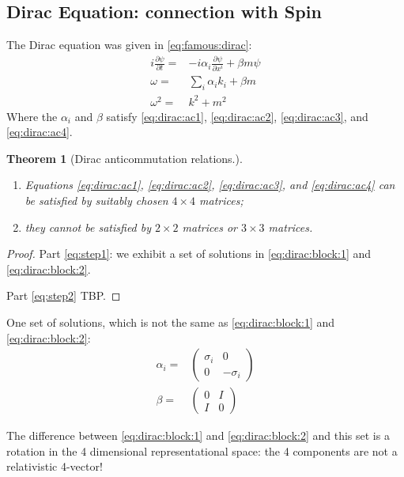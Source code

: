 \documentclass[]{article}
\newtheorem{thm}{Theorem}
\begin{document}
\subsection{Dirac Equation: connection with Spin}

The Dirac equation was given in \eqref{eq:famous:dirac}:
\begin{align*}
	i \frac{\partial \psi}{\partial t} =& - i \alpha_i \frac{\partial \psi}{\partial x^i} + \beta m \psi\\
	\omega =& \sum_i \alpha_i k_i + \beta m\\
	\omega^2 =& k^2 + m^2
\end{align*}
Where the $\alpha_i$ and $\beta$ satisfy \eqref{eq:dirac:ac1}, \eqref{eq:dirac:ac2}, \eqref{eq:dirac:ac3}, and \eqref{eq:dirac:ac4}.

\begin{thm}[Dirac anticommutation relations.]\label{thm:dirac:anticommutation} 
	\begin{enumerate}
		\item Equations \eqref{eq:dirac:ac1}, \eqref{eq:dirac:ac2}, \eqref{eq:dirac:ac3}, and \eqref{eq:dirac:ac4} can be satisfied by suitably chosen $4\times4$ matrices\label{eq:step1};
		\item  they cannot be satisfied by $2 \times 2$ matrices or $3 \times 3$ matrices\label{eq:step2}.
	\end{enumerate}
\end{thm}
\begin{proof}
	 Part \ref{eq:step1}: we exhibit a set of solutions in \eqref{eq:dirac:block:1} and \eqref{eq:dirac:block:2}.
	 
	 Part \ref{eq:step2} TBP.
\end{proof}

One set of solutions, which is not the same as \eqref{eq:dirac:block:1} and \eqref{eq:dirac:block:2}:
\begin{align*}
	\alpha_i=&\begin{pmatrix}
		\sigma_i&0\\
		0&-\sigma_i
	\end{pmatrix}\\
	\beta =& \begin{pmatrix}
		0&I\\
		I&0
	\end{pmatrix}
\end{align*}

The difference between \eqref{eq:dirac:block:1} and \eqref{eq:dirac:block:2} and this set is a rotation in the 4 dimensional representational space: the 4 components are not a relativistic 4-vector!
\end{document}
